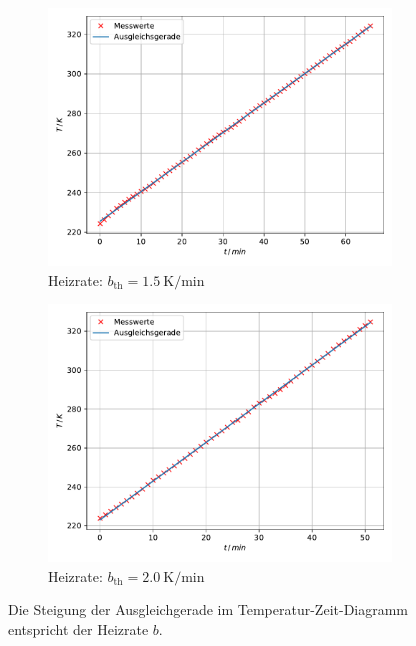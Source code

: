 \begin{figure}
    \begin{subfigure}{0.48\textwidth}
        \centering
        \includegraphics[height=0.8\textwidth]{content/data/char_relaxationszeit_15.pdf}
        \caption{Heizrate: $b_\text{th} = \SI{1.5}{\kelvin \per \minute}$}
        \label{subfig:t_T_15}
    \end{subfigure}
    \hfill
    \begin{subfigure}{0.48\textwidth}
        \centering
        \includegraphics[height=0.8\textwidth]{content/data/char_relaxationszeit_20.pdf}
        \caption{Heizrate: $b_\text{th} = \SI{2.0}{\kelvin \per \minute}$}
        \label{subfig:t_T_20}
    \end{subfigure}
    \caption{Die Steigung der Ausgleichgerade im Temperatur-Zeit-Diagramm entspricht der Heizrate $b$.\cite{matplotlib}\cite{scipy}\cite{numpy}}
    \label{fig:int}
\end{figure}
